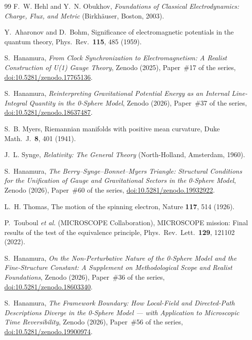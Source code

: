 \documentclass[%
 reprint, amsmath,amssymb, aps, prb, ]{revtex4-2}
\numberwithin{equation}{section}
\begin{document}
\begin{thebibliography}{99}
 F.~W. Hehl and Y.~N. Obukhov, \emph{Foundations of Classical Electrodynamics: Charge, Flux, and Metric} (Birkh\"auser, Boston, 2003).

 Y.~Aharonov and D.~Bohm, Significance of electromagnetic potentials in the quantum theory, Phys.\ Rev.\ \textbf{115}, 485 (1959).

 S.~Hanamura, \emph{From Clock Synchronization to Electromagnetism: A Realist Construction of U(1) Gauge Theory}, Zenodo (2025), Paper~\#17 of the series, \href{https://doi.org/10.5281/zenodo.17765136}{doi:10.5281/zenodo.17765136}.

 S.~Hanamura, \emph{Reinterpreting Gravitational Potential Energy as an Internal Line-Integral Quantity in the 0-Sphere Model}, Zenodo (2026), Paper~\#37 of the series, \href{https://doi.org/10.5281/zenodo.18637487}{doi:10.5281/zenodo.18637487}.

 S.~B. Myers, Riemannian manifolds with positive mean curvature, Duke Math.\ J.\ \textbf{8}, 401 (1941).

 J.~L. Synge, \emph{Relativity: The General Theory} (North-Holland, Amsterdam, 1960).

 S.~Hanamura, \emph{The Berry--Synge--Bonnet--Myers Triangle: Structural Conditions for the Unification of Gauge and Gravitational Sectors in the 0-Sphere Model}, Zenodo (2026), Paper~\#60 of the series, \href{https://doi.org/10.5281/zenodo.19932922}{doi:10.5281/zenodo.19932922}.

 L.~H. Thomas, The motion of the spinning electron, Nature \textbf{117}, 514 (1926).

 P.~Touboul \emph{et al.} (MICROSCOPE Collaboration), MICROSCOPE mission: Final results of the test of the equivalence principle, Phys.\ Rev.\ Lett.\ \textbf{129}, 121102 (2022).

 S.~Hanamura, \emph{On the Non-Perturbative Nature of the 0-Sphere Model and the Fine-Structure Constant: A Supplement on Methodological Scope and Realist Foundations}, Zenodo (2026), Paper~\#36 of the series, \href{https://doi.org/10.5281/zenodo.18603340}{doi:10.5281/zenodo.18603340}.

 S.~Hanamura, \emph{The Framework Boundary: How Local-Field and Directed-Path Descriptions Diverge in the 0-Sphere Model --- with Application to Microscopic Time Reversibility}, Zenodo (2026), Paper~\#56 of the series, \href{https://doi.org/10.5281/zenodo.19900974}{doi:10.5281/zenodo.19900974}.

\end{thebibliography}
\end{document}
